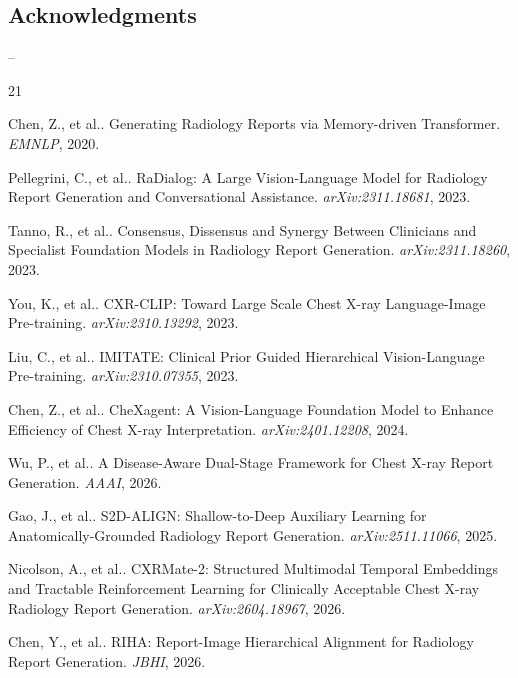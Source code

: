 \documentclass[runningheads,10pt]{llncs}
\begin{document}
\subsection*{Acknowledgments}
--

\begin{thebibliography}{21}

 Chen, Z., et al.. Generating Radiology Reports via Memory-driven Transformer. \emph{EMNLP}, 2020.

 Pellegrini, C., et al.. RaDialog: A Large Vision-Language Model for Radiology Report Generation and Conversational Assistance. \emph{arXiv:2311.18681}, 2023.

 Tanno, R., et al.. Consensus, Dissensus and Synergy Between Clinicians and Specialist Foundation Models in Radiology Report Generation. \emph{arXiv:2311.18260}, 2023.

 You, K., et al.. CXR-CLIP: Toward Large Scale Chest X-ray Language-Image Pre-training. \emph{arXiv:2310.13292}, 2023.

 Liu, C., et al.. IMITATE: Clinical Prior Guided Hierarchical Vision-Language Pre-training. \emph{arXiv:2310.07355}, 2023.

 Chen, Z., et al.. CheXagent: A Vision-Language Foundation Model to Enhance Efficiency of Chest X-ray Interpretation. \emph{arXiv:2401.12208}, 2024.

 Wu, P., et al.. A Disease-Aware Dual-Stage Framework for Chest X-ray Report Generation. \emph{AAAI}, 2026.

 Gao, J., et al.. S2D-ALIGN: Shallow-to-Deep Auxiliary Learning for Anatomically-Grounded Radiology Report Generation. \emph{arXiv:2511.11066}, 2025.

 Nicolson, A., et al.. CXRMate-2: Structured Multimodal Temporal Embeddings and Tractable Reinforcement Learning for Clinically Acceptable Chest X-ray Radiology Report Generation. \emph{arXiv:2604.18967}, 2026.

 Chen, Y., et al.. RIHA: Report-Image Hierarchical Alignment for Radiology Report Generation. \emph{JBHI}, 2026.


\end{thebibliography}
\end{document}
